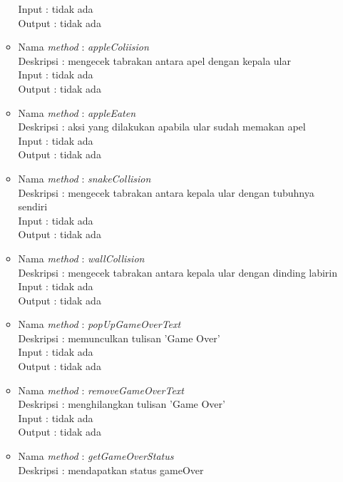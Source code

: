 \begin{enumerate}
\begin{itemize}
				  Input : tidak ada\\
				  Output : tidak ada\\
			\item Nama \textit{method} : \textit{appleColiision}\\
				  Deskripsi : mengecek tabrakan antara apel dengan kepala ular\\
				  Input : tidak ada\\
				  Output : tidak ada\\
			\item Nama \textit{method} : \textit{appleEaten}\\
				  Deskripsi : aksi yang dilakukan apabila ular sudah memakan apel\\
				  Input : tidak ada\\
				  Output : tidak ada\\
			\item Nama \textit{method} : \textit{snakeCollision}\\
				  Deskripsi : mengecek tabrakan antara kepala ular dengan tubuhnya sendiri\\
				  Input : tidak ada\\
				  Output : tidak ada\\
			\item Nama \textit{method} : \textit{wallCollision}\\
				  Deskripsi : mengecek tabrakan antara kepala ular dengan dinding labirin\\
				  Input : tidak ada\\
				  Output : tidak ada\\
			\item Nama \textit{method} : \textit{popUpGameOverText}\\
				  Deskripsi : memunculkan tulisan 'Game Over'\\
				  Input : tidak ada\\
				  Output : tidak ada\\
			\item Nama \textit{method} : \textit{removeGameOverText}\\
				  Deskripsi : menghilangkan tulisan 'Game Over'\\
				  Input : tidak ada\\
				  Output : tidak ada\\
			\item Nama \textit{method} : \textit{getGameOverStatus}\\
				  Deskripsi : mendapatkan status gameOver\\

\end{itemize}
\end{enumerate}
